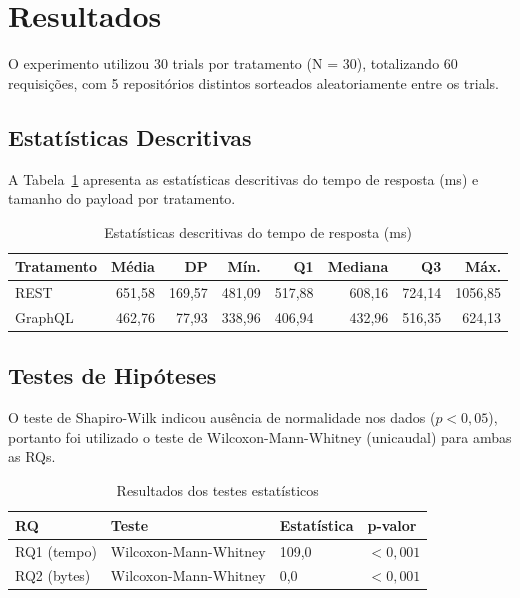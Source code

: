 \section{Resultados}

O experimento utilizou 30 trials por tratamento (N = 30), totalizando 60
requisições, com 5 repositórios distintos sorteados aleatoriamente entre os
trials.

\subsection{Estatísticas Descritivas}

A Tabela~\ref{tab:descritivas} apresenta as estatísticas descritivas do tempo
de resposta (ms) e tamanho do payload por tratamento.

\begin{table}[H]
\centering
\caption{Estatísticas descritivas do tempo de resposta (ms)}
\label{tab:descritivas}
\begin{tabular}{lrrrrrrr}
\toprule
Tratamento & Média & DP & Mín. & Q1 & Mediana & Q3 & Máx. \\
\midrule
REST & 651,58 & 169,57 & 481,09 & 517,88 & 608,16 & 724,14 & 1056,85 \\
GraphQL & 462,76 & 77,93 & 338,96 & 406,94 & 432,96 & 516,35 & 624,13 \\
\bottomrule
\end{tabular}
\end{table}

\subsection{Testes de Hipóteses}

O teste de Shapiro-Wilk indicou ausência de normalidade nos dados
($p < 0,05$), portanto foi utilizado o teste de Wilcoxon-Mann-Whitney
(unicaudal) para ambas as RQs.

\begin{table}[H]
\centering
\caption{Resultados dos testes estatísticos}
\label{tab:testes}
\begin{tabular}{llll}
\toprule
RQ & Teste & Estatística & p-valor \\
\midrule
RQ1 (tempo) & Wilcoxon-Mann-Whitney & 109,0 & $< 0,001$ \\
RQ2 (bytes) & Wilcoxon-Mann-Whitney & 0,0 & $< 0,001$ \\
\bottomrule
\end{tabular}
\end{table}

